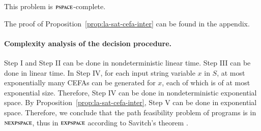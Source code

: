 %	
% 

\begin{proposition}\label{prop:la-sat-cefa-inter}
This {\lasat} problem is $\textsc{pspace}$-complete.
\end{proposition}

The proof of Proposition~\ref{prop:la-sat-cefa-inter} can be found in the appendix. 



\paragraph*{Complexity analysis of the decision procedure.} Step I and Step II can be done in nondeterministic linear time. Step III can be done in linear time. %
In Step IV, for each input string variable $x$ in $S$, at most exponentially many CEFAs can be generated for $x$, each of which is of at most exponential size. Therefore, Step IV can be done in nondeterministic exponential space. By Proposition~\ref{prop:la-sat-cefa-inter}, Step V can be done in exponential space. Therefore, we conclude that the path feasibility problem of {\slint} programs is in $\textsc{nexpspace}$, thus in $\textsc{expspace}$ according to Savitch's theorem \cite{complexity-book}. 


